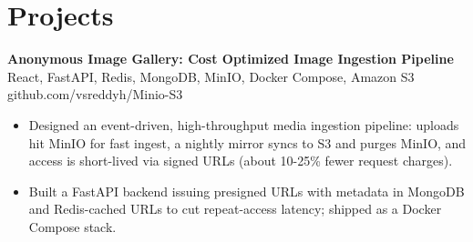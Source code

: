 \documentclass[a4paper,11pt]{article}
\newcommand{\resumeItem}[1]{\item \small{#1}}
\newcommand{\resumeSubheading}[4]{%
  \textbf{#1} \hfill \textbf{#2} \\
{#3} \hfill {#4}
}
\newcommand{\resumeSubHeadingListStart}{\begin{itemize}}
\newcommand{\resumeSubHeadingListEnd}{\end{itemize}}
\begin{document}
\section*{Projects}


\resumeSubheading
{Anonymous Image Gallery: Cost Optimized Image Ingestion Pipeline}{}{React, FastAPI, Redis, MongoDB, MinIO, Docker Compose, Amazon S3}{github.com/vsreddyh/Minio-S3}
\resumeSubHeadingListStart
\resumeItem{Designed an event-driven, high-throughput media ingestion pipeline: uploads hit MinIO for fast ingest, a nightly mirror syncs to S3 and purges MinIO, and access is short-lived via signed URLs (about 10-25\% fewer request charges).}
\resumeItem{Built a FastAPI backend issuing presigned URLs with metadata in MongoDB and Redis-cached URLs to cut repeat-access latency; shipped as a Docker Compose stack.}
\resumeSubHeadingListEnd

\vspace{-0.6em}
\end{document}
